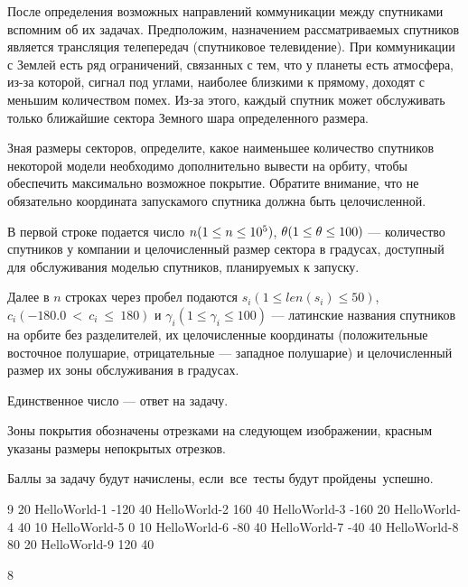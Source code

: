 
После определения возможных направлений коммуникации между спутниками вспомним об их задачах. Предположим, назначением рассматриваемых спутников является трансляция телепередач (спутниковое телевидение). При коммуникации с Землей есть ряд ограничений, связанных с тем, что у планеты есть атмосфера, из-за которой, сигнал под углами, наиболее близкими к прямому, доходят с меньшим количеством помех. Из-за этого, каждый спутник может обслуживать только ближайшие сектора Земного шара определенного размера. 


Зная размеры секторов, определите, какое наименьшее количество спутников некоторой модели необходимо дополнительно вывести на орбиту, чтобы обеспечить максимально возможное покрытие. Обратите внимание, что не обязательно координата запускамого спутника должна быть целочисленной. 


В первой строке подается число $ n\space(1 \leq n \leq 10^5) $, $ \theta\space (1 \leq \theta \leq 100) $ — количество спутников у компании и целочисленный размер сектора в градусах, доступный для обслуживания моделью спутников, планируемых к запуску.

Далее в $n$ строках через пробел подаются $ s_i(1\leq len(s_i)\leq 50)$, $ c_i(-180.0~<~c_i~\leq~180) $ и $ \gamma_i (1 \leq \gamma_i \leq 100)$  — латинские названия спутников на орбите без разделителей, их целочисленные координаты (положительные  восточное полушарие, отрицательные — западное полушарие) и целочисленный размер их зоны обслуживания в градусах.

\outputfmtSection

Единственное число — ответ на задачу.

\explanationSection

Зоны покрытия обозначены отрезками на следующем изображении, красным указаны размеры непокрытых отрезков.


\markSection

Баллы за задачу будут начислены, если все тесты будут пройдены успешно.


\begin{myverbbox}[\small]{\vinput}
    9 20
    HelloWorld-1 -120 40
    HelloWorld-2 160 40
    HelloWorld-3 -160 20
    HelloWorld-4 40 10
    HelloWorld-5 0 10
    HelloWorld-6 -80 40
    HelloWorld-7 -40 40
    HelloWorld-8 80 20
    HelloWorld-9 120 40
\end{myverbbox}
\begin{myverbbox}[\small]{\voutput}
    8
\end{myverbbox}




